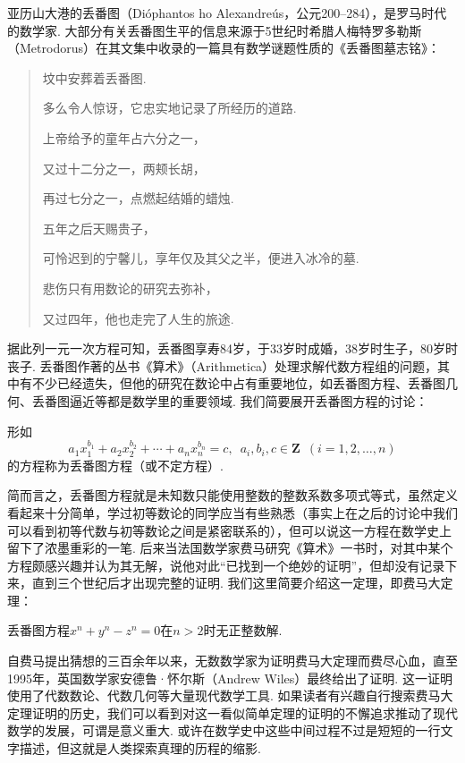 亚历山大港的丢番图（Dióphantos ho Alexandreús，公元200--284），是罗马时代的数学家. 大部分有关丢番图生平的信息来源于5世纪时希腊人梅特罗多勒斯（Metrodorus）在其文集中收录的一篇具有数学谜题性质的《丢番图墓志铭》：
\begin{quote}
    \kaishu
    坟中安葬着丢番图.

    多么令人惊讶，它忠实地记录了所经历的道路.

    上帝给予的童年占六分之一，

    又过十二分之一，两颊长胡，

    再过七分之一，点燃起结婚的蜡烛.

    五年之后天赐贵子，

    可怜迟到的宁馨儿，享年仅及其父之半，便进入冰冷的墓.

    悲伤只有用数论的研究去弥补，

    又过四年，他也走完了人生的旅途.
\end{quote}
据此列一元一次方程可知，丢番图享寿84岁，于33岁时成婚，38岁时生子，80岁时丧子. 丢番图作著的丛书《算术》（Arithmetica）处理求解代数方程组的问题，其中有不少已经遗失，但他的研究在数论中占有重要地位，如丢番图方程、丢番图几何、丢番图逼近等都是数学里的重要领域. 我们简要展开丢番图方程的讨论：
\begin{definition}
    形如
    \[a_1x_1^{b_1}+a_2x_2^{b_2}+\cdots+a_nx_n^{b_n}=c,\enspace a_i,b_i,c\in\mathbf{Z}\enspace(i=1,2,\ldots,n)\]
    的方程称为丢番图方程（或不定方程）.
\end{definition}

简而言之，丢番图方程就是未知数只能使用整数的整数系数多项式等式，虽然定义看起来十分简单，学过初等数论的同学应当有些熟悉（事实上在之后的讨论中我们可以看到初等代数与初等数论之间是紧密联系的），但可以说这一方程在数学史上留下了浓墨重彩的一笔. 后来当法国数学家费马研究《算术》一书时，对其中某个方程颇感兴趣并认为其无解，说他对此``已找到一个绝妙的证明''，但却没有记录下来，直到三个世纪后才出现完整的证明. 我们这里简要介绍这一定理，即费马大定理：
\begin{theorem}
    丢番图方程$x^n+y^n-z^n=0$在$n>2$时无正整数解.
\end{theorem}

自费马提出猜想的三百余年以来，无数数学家为证明费马大定理而费尽心血，直至1995年，英国数学家安德鲁·怀尔斯（Andrew Wiles）最终给出了证明. 这一证明使用了代数数论、代数几何等大量现代数学工具. 如果读者有兴趣自行搜索费马大定理证明的历史，我们可以看到对这一看似简单定理的证明的不懈追求推动了现代数学的发展，可谓是意义重大. 或许在数学史中这些中间过程不过是短短的一行文字描述，但这就是人类探索真理的历程的缩影.

